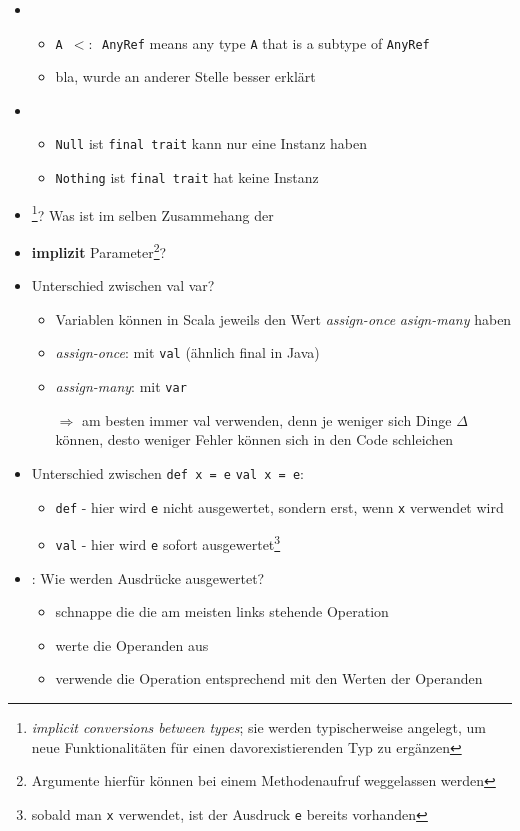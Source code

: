 \begin{itemize}
  \item {}

  \begin{itemize}
    \item \texttt{A $<:$ AnyRef} means any type \texttt{A} that is a 
    subtype of \texttt{AnyRef}
    \item bla, wurde an anderer Stelle besser erklärt
  \end{itemize}


  \item {}

  \begin{itemize}
    \item \texttt{Null} ist \texttt{final trait} \und kann nur eine 
    Instanz haben
    \item \texttt{Nothing} ist \texttt{final trait} \und hat keine Instanz
  \end{itemize}

  \item {}\footnote{\textit{implicit conversions between
  types}; sie werden typischerweise angelegt, um neue Funktionalitäten
  für einen davorexistierenden Typ zu ergänzen}? Was ist im selben 
  Zusammehang der 
  \item \textbf{implizit} Parameter\footnote{Argumente hierfür können 
  bei einem Methodenaufruf weggelassen werden}?
  \item Unterschied zwischen val \und var?
  \begin{itemize}
    \item Variablen können in Scala jeweils den Wert 
    \textit{assign-once} \oder \textit{asign-many} haben
    \item \textit{assign-once}: mit \texttt{val} (ähnlich final
    in Java)
    \item \textit{assign-many}: mit \texttt{var}
    
    $\Rightarrow$ am besten immer val verwenden, denn je weniger
    sich Dinge $\Delta$ können, desto weniger Fehler können sich
    in den Code schleichen
  \end{itemize}
  
  \item Unterschied zwischen \texttt{def x = e} \und \texttt{val x = e}:
  \begin{itemize}
    \item \texttt{def} - hier wird \texttt{e} nicht ausgewertet, sondern erst,
    wenn \texttt{x} verwendet wird
    \item \texttt{val} - hier wird \texttt{e} sofort 
    ausgewertet\footnote{sobald man \texttt{x} verwendet, ist der Ausdruck 
    \texttt{e} bereits vorhanden}
  \end{itemize}
  \item {}: Wie werden Ausdrücke ausgewertet? \begin{itemize}
    \item schnappe die die am meisten links stehende Operation
    \item werte die Operanden aus
    \item verwende die Operation entsprechend mit den Werten der Operanden
  \end{itemize}


\end{itemize}
